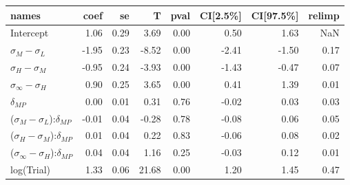 

\begin{tabular}{lrrrrrrr}
\toprule
                                         names &  coef &   se &     T &  pval &  CI[2.5\%] &  CI[97.5\%] &  relimp \\
\midrule
                                     Intercept &  1.06 & 0.29 &  3.69 &  0.00 &       0.50 &        1.63 &     NaN \\
                     $\sigma_{M} - \sigma_{L}$ & -1.95 & 0.23 & -8.52 &  0.00 &      -2.41 &       -1.50 &    0.17 \\
                     $\sigma_{H} - \sigma_{M}$ & -0.95 & 0.24 & -3.93 &  0.00 &      -1.43 &       -0.47 &    0.07 \\
                $\sigma_{\infty} - \sigma_{H}$ &  0.90 & 0.25 &  3.65 &  0.00 &       0.41 &        1.39 &    0.01 \\
                                 $\delta_{MP}$ &  0.00 & 0.01 &  0.31 &  0.76 &      -0.02 &        0.03 &    0.03 \\
     ($\sigma_{M} - \sigma_{L}$):$\delta_{MP}$ & -0.01 & 0.04 & -0.28 &  0.78 &      -0.08 &        0.06 &    0.05 \\
     ($\sigma_{H} - \sigma_{M}$):$\delta_{MP}$ &  0.01 & 0.04 &  0.22 &  0.83 &      -0.06 &        0.08 &    0.02 \\
($\sigma_{\infty} - \sigma_{H}$):$\delta_{MP}$ &  0.04 & 0.04 &  1.16 &  0.25 &      -0.03 &        0.12 &    0.01 \\
                                    log(Trial) &  1.33 & 0.06 & 21.68 &  0.00 &       1.20 &        1.45 &    0.47 \\
\bottomrule
\end{tabular}


